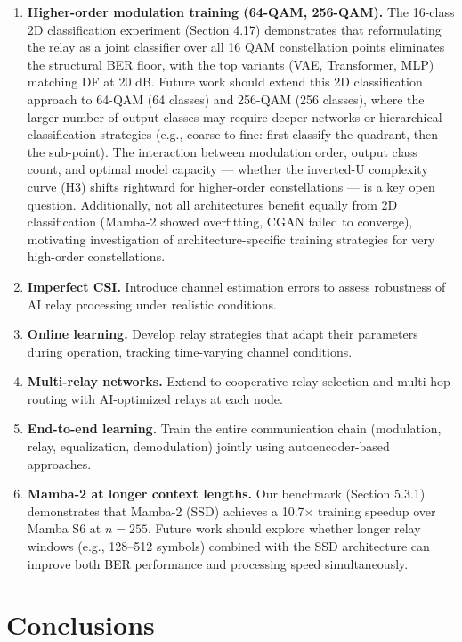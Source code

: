 \begin{enumerate}
\def\labelenumi{\arabic{enumi}.}
\item
  \textbf{Higher-order modulation training (64-QAM, 256-QAM).} The 16-class 2D classification experiment (Section 4.17) demonstrates that reformulating the relay as a joint classifier over all 16 QAM constellation points eliminates the structural BER floor, with the top variants (VAE, Transformer, MLP) matching DF at 20 dB. Future work should extend this 2D classification approach to 64-QAM (64 classes) and 256-QAM (256 classes), where the larger number of output classes may require deeper networks or hierarchical classification strategies (e.g., coarse-to-fine: first classify the quadrant, then the sub-point). The interaction between modulation order, output class count, and optimal model capacity --- whether the inverted-U complexity curve (H3) shifts rightward for higher-order constellations --- is a key open question. Additionally, not all architectures benefit equally from 2D classification (Mamba-2 showed overfitting, CGAN failed to converge), motivating investigation of architecture-specific training strategies for very high-order constellations.
\item
  \textbf{Imperfect CSI.} Introduce channel estimation errors to assess robustness of AI relay processing under realistic conditions.
\item
  \textbf{Online learning.} Develop relay strategies that adapt their parameters during operation, tracking time-varying channel conditions.
\item
  \textbf{Multi-relay networks.} Extend to cooperative relay selection and multi-hop routing with AI-optimized relays at each node.
\item
  \textbf{End-to-end learning.} Train the entire communication chain (modulation, relay, equalization, demodulation) jointly using autoencoder-based approaches.
\item
  \textbf{Mamba-2 at longer context lengths.} Our benchmark (Section 5.3.1) demonstrates that Mamba-2 (SSD) achieves a 10.7× training speedup over Mamba S6 at \(n = 255\). Future work should explore whether longer relay windows (e.g., 128--512 symbols) combined with the SSD architecture can improve both BER performance and processing speed simultaneously.
\end{enumerate}

\section{Conclusions}\label{sec:conclusions}

